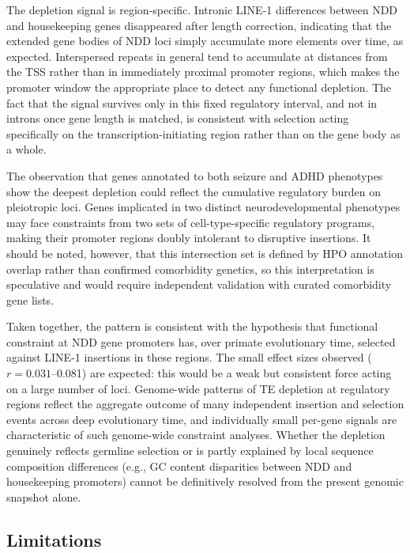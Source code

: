 \documentclass[11pt, a4paper]{article}
\begin{document}
The depletion signal is region-specific. Intronic LINE-1
differences between NDD and housekeeping genes disappeared
after length correction, indicating that the extended gene
bodies of NDD loci simply accumulate more elements over time,
as expected. Interspersed repeats in general tend to
accumulate at distances from the TSS rather than in
immediately proximal promoter regions\cite{liang2015}, which
makes the promoter window the appropriate place to detect any
functional depletion. The fact that the signal survives only
in this fixed regulatory interval, and not in introns once
gene length is matched, is consistent with selection acting
specifically on the transcription-initiating region rather
than on the gene body as a whole.

The observation that genes annotated to both seizure and ADHD
phenotypes show the deepest depletion could reflect the
cumulative regulatory burden on pleiotropic loci. Genes
implicated in two distinct neurodevelopmental phenotypes may
face constraints from two sets of cell-type-specific
regulatory programs, making their promoter regions doubly
intolerant to disruptive insertions. It should be noted,
however, that this intersection set is defined by HPO
annotation overlap rather than confirmed comorbidity
genetics, so this interpretation is speculative and would
require independent validation with curated comorbidity
gene lists.

Taken together, the pattern is consistent with the hypothesis
that functional constraint at NDD gene promoters has, over
primate evolutionary time, selected against LINE-1 insertions in
these regions. The small effect sizes observed ($r = 0.031$--0.081) are expected: this would be a weak but
consistent force acting on a large number of loci. Genome-wide
patterns of TE depletion at regulatory regions reflect the
aggregate outcome of many independent insertion and selection
events across deep evolutionary time, and individually small
per-gene signals are characteristic of such
genome-wide constraint analyses\cite{simonti2017,
chuong2016}. Whether the depletion genuinely reflects
germline selection or is partly explained by local sequence
composition differences (e.g., GC content disparities between NDD and housekeeping promoters) cannot be definitively resolved from the present genomic snapshot alone.

\subsection*{Limitations}
\end{document}
